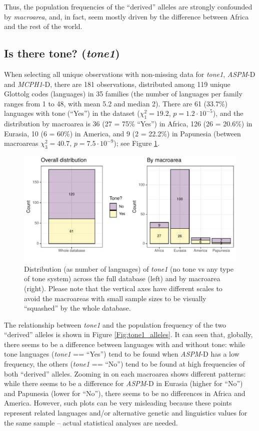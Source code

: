 \documentclass[twoside,onecolumn]{article}
\begin{document}
Thus, the population frequencies of the ``derived'' alleles are strongly confounded by \textit{macroarea}, and, in fact, seem mostly driven by the difference between Africa and the rest of the world.


\subsection{Is there tone? (\textit{tone1})}

When selecting all unique observations with non-missing data for \textit{tone1}, \textit{ASPM}-D and \textit{MCPH1}-D, there are 181 observations, distributed among 119 unique Glottolg codes (languages) in 35 families (the number of languages per family ranges from 1 to 48, with mean 5.2 and median 2).
There are 61 (33.7\%) languages with tone (``Yes'') in the dataset ($\chi^2_{1} = 19.2$, $p = 1.2\cdot10^{-5}$), and the distribution by macroarea is 36 (27 = 75\% ``Yes'') in Africa, 126 (26 = 20.6\%) in Eurasia, 10 (6 = 60\%) in America, and 9 (2 = 22.2\%) in Papunesia (between macroareas $\chi^2_{3} = 40.7$, $p = 7.5\cdot10^{-9}$); see Figure \ref{Fig:tone1_distribution}.

\begin{figure}[h]
  \centering
  \includegraphics[width=\textwidth]{../../code/figures/tone1_distribution}
  \caption{Distribution (as number of languages) of \textit{tone1} (no tone vs any type of tone system) across the full database (left) and by macroarea (right). Please note that the vertical axes have different scales to avoid the macroareas with small sample sizes to be visually ``squashed'' by the whole database.}
  \label{Fig:tone1_distribution}
\end{figure}

The relationship between \textit{tone1} and the population frequency of the two ``derived'' alleles is shown in Figure \ref{Fig:tone1_alleles}.
It can seen that, globally, there seems to be a difference between languages with and without tone: while tone languages (\textit{tone1} == ``Yes'') tend to be found when \textit{ASPM}-D has a low frequency, the others (\textit{tone1} == ``No'') tend to be found at high frequencies of both ``derived'' alleles.
Zooming in on each macroarea shows different patterns: while there seems to be a difference for \textit{ASPM}-D in Eurasia (higher for ``No'') and Papunesia (lower for ``No''), there seems to be no differences in Africa and America.
However, such plots can be very misleading because these points represent related languages and/or alternative genetic and linguistics values for the same sample -- actual statistical analyses are needed.
\end{document}
